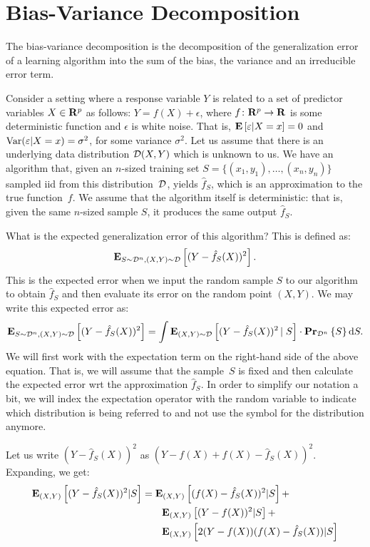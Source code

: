 \chapter{Bias-Variance Decomposition}

The bias-variance decomposition is the decomposition of the generalization
error of a learning algorithm into the sum of the bias, the variance and an irreducible
error term.

Consider a setting where a response variable $Y$ is related to a set of
predictor variables $X \in \mathbf{R}^p$ as follows: $Y = f(X) + \epsilon$, where
$f \colon \mathbf{R}^p \rightarrow \mathbf{R}$ is some deterministic function and
$\epsilon$ is white noise. That is, $\mathbf{E} \left [ \varepsilon \vert X = x \right ] = 0$ and
$\text{Var} (\varepsilon \vert X = x) = \sigma^2$, for some variance $\sigma^2$. Let us
assume that there is an underlying data distribution $\mathcal{D} (X, Y)$ which is
unknown to us. We have an algorithm that, given an $n$-sized training set
$S = \{ (x_1, y_1), \ldots, (x_n, y_n) \}$ sampled iid from this distribution~$\mathcal{D}$,
yields $\hat{f}_S$, which is an approximation to the true function~$f$.
We assume that the algorithm itself is deterministic: that is, given the same
$n$-sized sample $S$, it produces the same output $\hat{f}_S$.

What is the expected generalization error of this algorithm? This is defined
as:
\begin{equation}
    \mathbf{E}_{S \sim \mathcal{D}^n, (X, Y) \sim \mathcal{D}} \left [ (Y - \hat{f}_S(X))^2 \right ].
\end{equation}
This is the expected error when we input the random sample $S$ to our algorithm
to obtain $\hat{f}_S$ and then evaluate its error on the random point $(X, Y)$.
We may write this expected error as:
\begin{equation} \label{eqn:basic_integral}
    \mathbf{E}_{S \sim \mathcal{D}^n, (X, Y) \sim \mathcal{D}} \left [ (Y - \hat{f}_S(X))^2 \right ] =
    \int \mathbf{E}_{(X, Y) \sim \mathcal{D}} \left [ (Y - \hat{f}_S(X))^2 \left \vert \right . S \right ]
    \cdot \mathbf{Pr}_{\mathcal{D}^n} \left \{ S \right \} \text{d} S.
\end{equation}
We will first work with the expectation term on the right-hand side of the above
equation. That is, we will assume that the sample~$S$ is fixed and then calculate
the expected error wrt the approximation $\hat{f}_S$. In order to simplify our
notation a bit, we will index the expectation operator with the random variable
to indicate which distribution is being referred to and not use the symbol
for the distribution anymore.

Let us write $(Y - \hat{f}_S(X))^2$ as $(Y - f(X) + f(X) - \hat{f}_S(X))^2$.
Expanding, we get:
\begin{equation}\label{eqn:break_up}
\begin{split}
    \mathbf{E}_{(X, Y)} \left [ (Y - \hat{f}_S(X))^2 \vert S \right ] & =
    \mathbf{E}_{(X, Y)} \left [ (f(X) - \hat{f}_S(X))^2 \vert S \right ] + \\
    & \quad \quad \mathbf{E}_{(X, Y)} \left [ (Y - f(X))^2 \vert S \right ] + \\
    & \quad \quad \mathbf{E}_{(X, Y)} \left [ 2 (Y - f(X)) (f(X) - \hat{f}_S(X)) \vert S \right ]
\end{split}
\end{equation}

